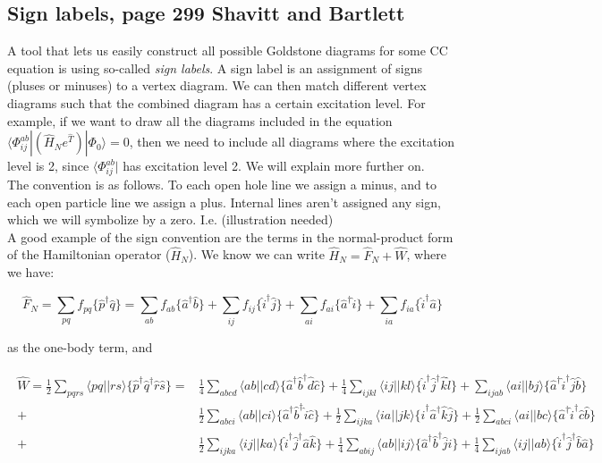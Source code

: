 \documentclass[10pt]{report}
\begin{document}
	\subsection{Sign labels, page 299 Shavitt and Bartlett}
	A tool that lets us easily construct all possible Goldstone diagrams for some CC equation is using so-called \emph{sign labels}. A sign label is an assignment of signs (pluses or minuses) to a vertex diagram. We can then match different vertex diagrams such that the combined diagram has a certain excitation level. For example, if we want to draw all the diagrams included in the equation $\langle\Phi_{ij}^{ab}|\left(\hat{H}_Ne^{\hat
		T}\right)|\Phi_0\rangle = 0$, then we need to include all diagrams where the excitation level is 2, since $\langle\Phi_{ij}^{ab}|$ has excitation level 2. We will explain more further on.\\
	The convention is as follows. To each open hole line we assign a minus, and to each open particle line we assign a plus. Internal lines aren't assigned any sign, which we will symbolize by a zero. I.e. (illustration needed)\\
	
	A good example of the sign convention are the terms in the normal-product form of the Hamiltonian operator ($\hat{H}_N$). We know we can write $\hat{H}_N = \hat{F}_N + \hat{W}$, where we have:
	
	\begin{equation}
		\hat{F}_N = \sum_{pq} f_{pq}\{\hat{p}^\dagger \hat{q}\} = \sum_{ab} f_{ab}\{\hat{a}^\dagger \hat{b}\} + \sum_{ij} f_{ij}\{\hat{i}^\dagger \hat{j}\} + \sum_{ai} f_{ai}\{\hat{a}^\dagger \hat{i}\} + \sum_{ia} f_{ia}\{\hat{i}^\dagger \hat{a}\}
	\end{equation}
	
	as the one-body term, and
	
	\begin{align}
		\begin{split}
		\hat{W} = \frac{1}{2}\sum_{pqrs}\langle pq||rs\rangle \{\hat{p}^\dagger\hat{q}^\dagger\hat{r}\hat{s}\} = &\frac{1}{4}\sum_{abcd}\langle ab||cd\rangle \{\hat{a}^\dagger\hat{b}^\dagger\hat{d}\hat{c}\} + \frac{1}{4}\sum_{ijkl}\langle ij||kl\rangle \{\hat{i}^\dagger\hat{j}^\dagger\hat{k}\hat{l}\} + \sum_{ijab}\langle ai||bj\rangle \{\hat{a}^\dagger\hat{i}^\dagger\hat{j}\hat{b}\} \\
		+&\frac{1}{2}\sum_{abci}\langle ab||ci\rangle \{\hat{a}^\dagger\hat{b}^\dagger\hat{i}\hat{c}\} + \frac{1}{2}\sum_{ijka}\langle ia||jk\rangle \{\hat{i}^\dagger\hat{a}^\dagger\hat{k}\hat{j}\} + \frac{1}{2}\sum_{abci}\langle ai||bc\rangle \{\hat{a}^\dagger\hat{i}^\dagger\hat{c}\hat{b}\} \\
		+&\frac{1}{2}\sum_{ijka}\langle ij||ka\rangle \{\hat{i}^\dagger\hat{j}^\dagger\hat{a}\hat{k}\} + \frac{1}{4}\sum_{abij}\langle ab||ij\rangle \{\hat{a}^\dagger\hat{b}^\dagger\hat{j}\hat{i}\} + \frac{1}{4}\sum_{ijab}\langle ij||ab\rangle \{\hat{i}^\dagger\hat{j}^\dagger\hat{b}\hat{a}\}
		\end{split}
	\end{align}
	
\end{document}
